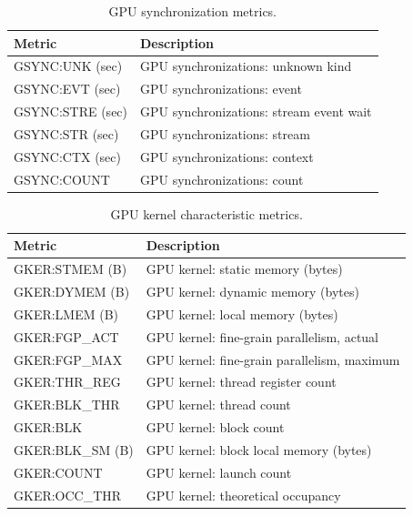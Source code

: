 \begin{table}[h]
\centering
\begin{tabular}{|l|l|}\hline
Metric & Description\\\hline\hline
 GSYNC:UNK (sec)  &  GPU synchronizations: unknown kind  \\\hline
  GSYNC:EVT (sec)  &  GPU synchronizations: event  \\\hline
  GSYNC:STRE (sec)  &  GPU synchronizations: stream event wait  \\\hline
  GSYNC:STR (sec)  &  GPU synchronizations: stream  \\\hline
  GSYNC:CTX (sec)  &  GPU synchronizations: context  \\\hline
  GSYNC:COUNT  &  GPU synchronizations: count  \\\hline
\end{tabular}
\caption{GPU synchronization metrics.}
\label{table:gsync}
\end{table}


\begin{table}[h]
\centering
\begin{tabular}{|l|l|}\hline
Metric & Description\\\hline\hline
GKER:STMEM (B) & GPU kernel: static memory (bytes)    \\\hline
GKER:DYMEM (B) & GPU kernel: dynamic memory (bytes)   \\\hline
GKER:LMEM (B) & GPU kernel: local memory (bytes)    \\\hline
GKER:FGP\_ACT & GPU kernel: fine-grain parallelism, actual    \\\hline
GKER:FGP\_MAX & GPU kernel: fine-grain parallelism, maximum    \\\hline
GKER:THR\_REG & GPU kernel: thread register count    \\\hline
GKER:BLK\_THR & GPU kernel: thread count   \\\hline
GKER:BLK  & GPU kernel: block count   \\\hline
GKER:BLK\_SM (B) & GPU kernel: block local memory (bytes)   \\\hline
GKER:COUNT & GPU kernel: launch count   \\\hline
GKER:OCC\_THR & GPU kernel: theoretical occupancy    \\\hline
\end{tabular}
\caption{GPU kernel characteristic metrics.}
\label{table:gker}
\end{table}

